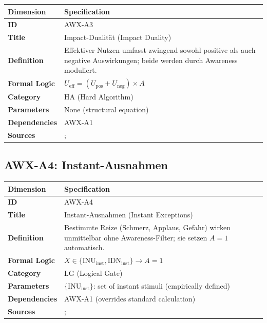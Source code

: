 \begin{table}[htbp]
\small
\begin{tabular}{p{3cm}p{11cm}}
\toprule
\textbf{Dimension} & \textbf{Specification} \\
\midrule
\textbf{ID} & AWX-A3 \\
\textbf{Title} & Impact-Dualität (Impact Duality) \\
\textbf{Definition} & Effektiver Nutzen umfasst zwingend sowohl positive als auch negative Auswirkungen; beide werden durch Awareness moduliert. \\
\textbf{Formal Logic} & $U_{\text{eff}} = (U_{\text{pos}} + U_{\text{neg}}) \times A$ \\
\textbf{Category} & HA (Hard Algorithm) \\
\textbf{Parameters} & None (structural equation) \\
\textbf{Dependencies} & AWX-A1 \\
\textbf{Sources} & \citet{kahneman1991loss}; \citet{PAP-tversky1992advances} \\
\bottomrule
\end{tabular}
\end{table}


\subsection{AWX-A4: Instant-Ausnahmen}

\begin{table}[htbp]
\small
\begin{tabular}{p{3cm}p{11cm}}
\toprule
\textbf{Dimension} & \textbf{Specification} \\
\midrule
\textbf{ID} & AWX-A4 \\
\textbf{Title} & Instant-Ausnahmen (Instant Exceptions) \\
\textbf{Definition} & Bestimmte Reize (Schmerz, Applaus, Gefahr) wirken unmittelbar ohne Awareness-Filter; sie setzen $A = 1$ automatisch. \\
\textbf{Formal Logic} & $X \in \{\text{INU}_{\text{inst}}, \text{IDN}_{\text{inst}}\} \rightarrow A = 1$ \\
\textbf{Category} & LG (Logical Gate) \\
\textbf{Parameters} & $\{\text{INU}_{\text{inst}}\}$: set of instant stimuli (empirically defined) \\
\textbf{Dependencies} & AWX-A1 (overrides standard calculation) \\
\textbf{Sources} & \citet{PAP-kahneman2003maps}; \citet{loewenstein2001risk} \\
\bottomrule
\end{tabular}
\end{table}

